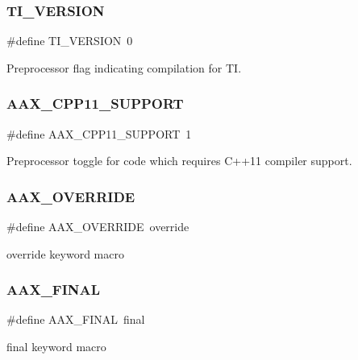 \subsubsection{\texorpdfstring{TI\_VERSION}{TI\_VERSION}}
{\footnotesize\ttfamily \#define T\+I\+\_\+\+V\+E\+R\+S\+I\+ON~0}



Preprocessor flag indicating compilation for TI. 

\mbox{\label{a00392_a2da185ff8aad77278f985a6fe5ee07ba}} 
\subsubsection{\texorpdfstring{AAX\_CPP11\_SUPPORT}{AAX\_CPP11\_SUPPORT}}
{\footnotesize\ttfamily \#define A\+A\+X\+\_\+\+C\+P\+P11\+\_\+\+S\+U\+P\+P\+O\+RT~1}



Preprocessor toggle for code which requires C++11 compiler support. 

\mbox{\label{a00392_ac2f24a5172689ae684344abdcce55463}} 
\subsubsection{\texorpdfstring{AAX\_OVERRIDE}{AAX\_OVERRIDE}}
{\footnotesize\ttfamily \#define A\+A\+X\+\_\+\+O\+V\+E\+R\+R\+I\+DE~override}



{\ttfamily override} keyword macro 

\mbox{\label{a00392_aa4da4a09e940c332a2205e34e0677f40}} 
\subsubsection{\texorpdfstring{AAX\_FINAL}{AAX\_FINAL}}
{\footnotesize\ttfamily \#define A\+A\+X\+\_\+\+F\+I\+N\+AL~final}



{\ttfamily final} keyword macro 

\mbox{\label{a00392_aa2e8b7a189710394388ad3b0a782de86}} 
